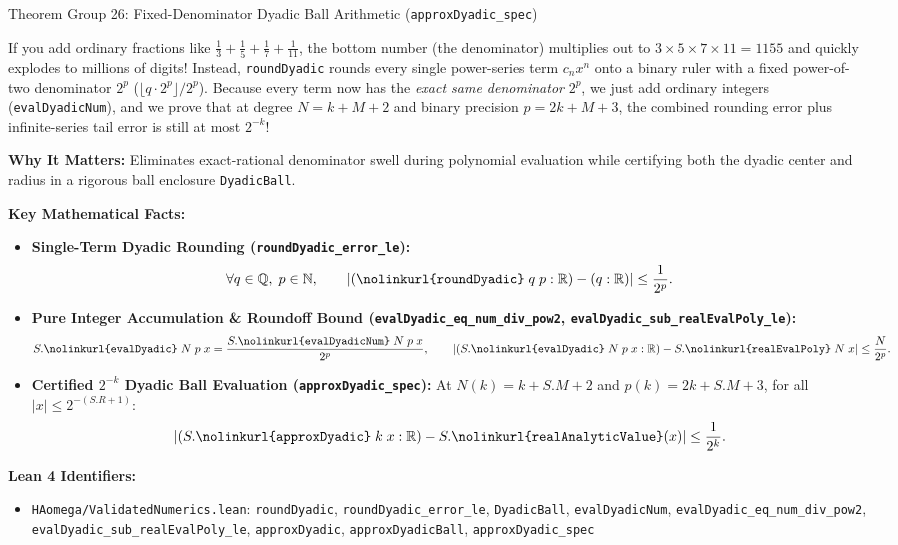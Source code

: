 \documentclass[11pt,a4paper]{article}
\newcommand{\N}{\ensuremath{\mathbb{N}}}
\newcommand{\Q}{\ensuremath{\mathbb{Q}}}
\newcommand{\R}{\ensuremath{\mathbb{R}}}
\newcommand{\lean}[1]{\texttt{\nolinkurl{#1}}}
\begin{document}
\begin{thmcard}{Theorem Group 26: Fixed-Denominator Dyadic Ball Arithmetic (\texorpdfstring{\lean{approxDyadic_spec}}{approxDyadic\_spec})}
\begin{eli5box}
If you add ordinary fractions like $\frac{1}{3} + \frac{1}{5} + \frac{1}{7} + \frac{1}{11}$, the bottom number (the denominator) multiplies out to $3 \times 5 \times 7 \times 11 = 1155$ and quickly explodes to millions of digits! Instead, \lean{roundDyadic} rounds every single power-series term $c_n x^n$ onto a binary ruler with a fixed power-of-two denominator $2^p$ ($\lfloor q \cdot 2^p \rfloor / 2^p$). Because every term now has the \emph{exact same denominator} $2^p$, we just add ordinary integers (\lean{evalDyadicNum}), and we prove that at degree $N = k + M + 2$ and binary precision $p = 2k + M + 3$, the combined rounding error plus infinite-series tail error is still at most $2^{-k}$!
\end{eli5box}

\textbf{Why It Matters:}
Eliminates exact-rational denominator swell during polynomial evaluation while certifying both the dyadic center and radius in a rigorous ball enclosure \lean{DyadicBall}.

\textbf{Key Mathematical Facts:}
\begin{itemize}
  \item \textbf{Single-Term Dyadic Rounding (\lean{roundDyadic_error_le}):}
  \[
    \forall q \in \Q,\; p \in \N,\qquad \left|(\lean{roundDyadic}\;q\;p : \R) - (q : \R)\right| \le \frac{1}{2^p}.
  \]
  \item \textbf{Pure Integer Accumulation \& Roundoff Bound (\lean{evalDyadic_eq_num_div_pow2}, \lean{evalDyadic_sub_realEvalPoly_le}):}
  \[
    S.\lean{evalDyadic}\;N\;p\;x = \frac{S.\lean{evalDyadicNum}\;N\;p\;x}{2^p}, \qquad
    \left|(S.\lean{evalDyadic}\;N\;p\;x : \R) - S.\lean{realEvalPoly}\;N\;x\right| \le \frac{N}{2^p}.
  \]
  \item \textbf{Certified $2^{-k}$ Dyadic Ball Evaluation (\lean{approxDyadic_spec}):} At $N(k) = k + S.M + 2$ and $p(k) = 2k + S.M + 3$, for all $|x| \le 2^{-(S.R+1)}$:
  \[
    \left|(S.\lean{approxDyadic}\;k\;x : \R) - S.\lean{realAnalyticValue}(x)\right| \le \frac{1}{2^k}.
  \]
\end{itemize}

\textbf{Lean 4 Identifiers:}
\begin{itemize}
  \item \lean{HAomega/ValidatedNumerics.lean}: \lean{roundDyadic}, \lean{roundDyadic_error_le}, \lean{DyadicBall}, \lean{evalDyadicNum}, \lean{evalDyadic_eq_num_div_pow2}, \lean{evalDyadic_sub_realEvalPoly_le}, \lean{approxDyadic}, \lean{approxDyadicBall}, \lean{approxDyadic_spec}
\end{itemize}
\end{thmcard}
\end{document}
